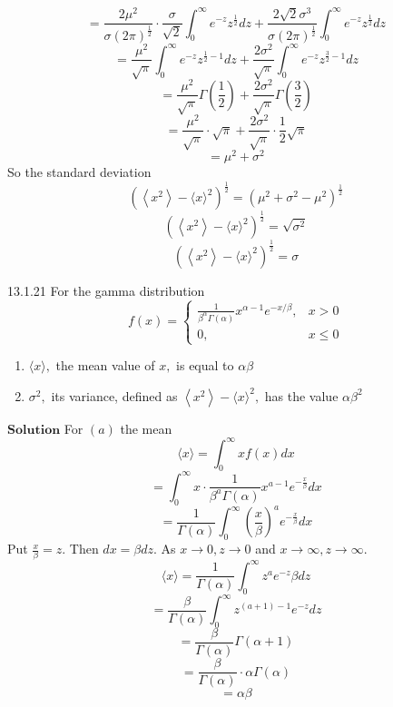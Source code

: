 \documentclass{article}
\begin{document}
\begin{flushleft}
$$=\frac{2 \mu^{2}}{\sigma(2 \pi)^{\frac{1}{2}}} \cdot \frac{\sigma}{\sqrt{2}} \int_{0}^{\infty} e^{-z} z^{\frac{1}{2}} d z+\frac{2 \sqrt{2} \sigma^{3}}{\sigma(2 \pi)^{\frac{1}{2}}} \int_{0}^{\infty} e^{-z} z^{\frac{1}{2}} d z$$
$$=\frac{\mu^{2}}{\sqrt{\pi}} \int_{0}^{\infty} e^{-z} z^{\frac{1}{2}-1} d z+\frac{2 \sigma^{2}}{\sqrt{\pi}} \int_{0}^{\infty} e^{-z} z^{\frac{3}{2}-1} d z$$
$$=\frac{\mu^{2}}{\sqrt{\pi}} \Gamma\left(\frac{1}{2}\right)+\frac{2 \sigma^{2}}{\sqrt{\pi}} \Gamma\left(\frac{3}{2}\right)$$
$$=\frac{\mu^{2}}{\sqrt{\pi}} \cdot \sqrt{\pi}+\frac{2 \sigma^{2}}{\sqrt{\pi}} \cdot \frac{1}{2} \sqrt{\pi}$$
$$=\mu^{2}+\sigma^{2}$$
So the standard deviation 
$$\left(\left\langle x^{2}\right\rangle-\langle x\rangle^{2}\right)^{\frac{1}{2}}=\left(\mu^{2}+\sigma^{2}-\mu^{2}\right)^{\frac{1}{2}}$$
$$\left(\left\langle x^{2}\right\rangle-\langle x\rangle^{2}\right)^{\frac{1}{2}}=\sqrt{\sigma^{2}}$$
$$\left(\left\langle x^{2}\right\rangle-\langle x\rangle^{2}\right)^{\frac{1}{2}}=\sigma$$


\newpage

\begin{mybox}{13.1.21}
For the gamma distribution
$$
f(x)=\left\{\begin{array}{ll}
\frac{1}{\beta^{\alpha} \Gamma(\alpha)} x^{\alpha-1} e^{-x / \beta}, & x>0 \\
0, & x \leq 0
\end{array}\right.
$$
\begin{enumerate}[$(a)$]
\item $\langle x\rangle,$ the mean value of $x,$ is equal to $\alpha \beta$
\item $\sigma^{2},$ its variance, defined as $\left\langle x^{2}\right\rangle-\langle x\rangle^{2},$ has the value $\alpha \beta^{2}$
\end{enumerate}
\end{mybox}

$\boxed{\textbf{Solution}}$ For $(a)$ the mean
$$
\langle x\rangle=\int_{0}^{\infty} x f(x) d x
$$
$$=\int_{0}^{\infty} x \cdot \frac{1}{\beta^{a} \Gamma(\alpha)} x^{a-1} e^{-\frac{x}{\beta}} d x$$
$$=\frac{1}{\Gamma(\alpha)} \int_{0}^{\infty}\left(\frac{x}{\beta}\right)^{a} e^{-\frac{x}{\beta}} d x$$
Put $\frac{x}{\beta}=z .$ Then $d x=\beta d z .$ As $x \rightarrow 0, z \rightarrow 0$ and $x \rightarrow \infty, z \rightarrow \infty$.
$$
\langle x\rangle=\frac{1}{\Gamma(\alpha)} \int_{0}^{\infty} z^{a} e^{-z} \beta d z
$$
$$=\frac{\beta}{\Gamma(\alpha)} \int_{0}^{\infty} z^{(a+1)-1} e^{-z} d z$$
$$=\frac{\beta}{\Gamma(\alpha)} \Gamma(\alpha+1)$$
$$=\frac{\beta}{\Gamma(\alpha)} \cdot \alpha \Gamma(\alpha)$$
$$=\alpha \beta$$


\end{flushleft}
\end{document}
